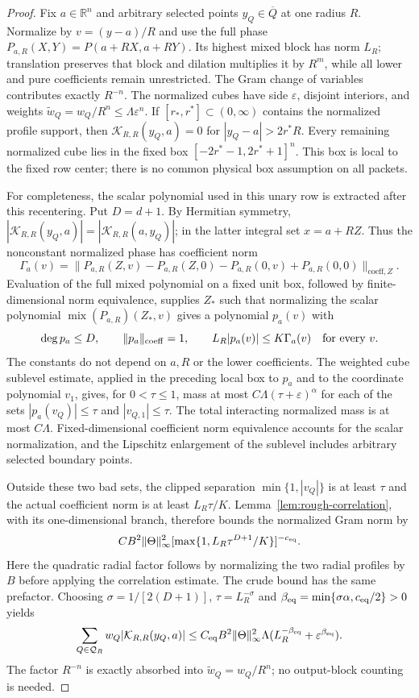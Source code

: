 \documentclass[11pt]{article}
\numberwithin{equation}{section}
\theoremstyle{remark}
\theoremstyle{definition}
\newcommand{\R}{\mathbb R}
\newcommand{\norm}[1]{\lVert #1\rVert}
\begin{document}
\begin{proof}
Fix $a\in\R^n$ and arbitrary selected points $y_Q\in\overline Q$ at
one radius $R$.  Normalize by $v=(y-a)/R$ and use the full phase
$P_{a,R}(X,Y)=P(a+RX,a+RY)$.  Its highest mixed block has norm
$L_R$; translation preserves that block and dilation multiplies it by
$R^m$, while all lower and pure coefficients remain unrestricted.
The Gram change of variables contributes exactly $R^{-n}$.
The normalized cubes have side $\varepsilon$, disjoint interiors,
and weights $\widetilde w_Q=w_Q/R^n\le\Lambda\varepsilon^n$.
If $[r_*,r^*]\subset(0,\infty)$ contains the normalized profile support,
then $\mathcal K_{R,R}(y_Q,a)=0$ for $|y_Q-a|>2r^*R$.
Every remaining normalized cube lies in the fixed box
$[-2r^*-1,2r^*+1]^n$.  This box is local to the fixed row center;
there is no common physical box assumption on all packets.

For completeness, the scalar polynomial used in this unary row is
extracted after this recentering.  Put $D=d+1$.  By Hermitian symmetry,
$|\mathcal K_{R,R}(y_Q,a)|=|\mathcal K_{R,R}(a,y_Q)|$; in the latter
integral set $x=a+RZ$.  Thus the nonconstant normalized phase has
coefficient norm
\[
 \Gamma_a(v)=\bigl\|P_{a,R}(Z,v)-P_{a,R}(Z,0)
               -P_{a,R}(0,v)+P_{a,R}(0,0)\bigr\|_{\mathrm{coeff},Z}.
\]
Evaluation of the full mixed polynomial on a fixed unit box, followed
by finite-dimensional norm equivalence, supplies $Z_*$ such that
normalizing the scalar polynomial
$\operatorname{mix}(P_{a,R})(Z_*,v)$ gives a polynomial $p_a(v)$ with
\[
 \deg p_a\le D,\qquad\norm{p_a}_{\rm coeff}=1,
 \qquad L_R|p_a(v)|\le K\Gamma_a(v)\quad\hbox{for every }v.
\]
The constants do not depend on $a,R$ or the lower coefficients.
The weighted cube sublevel estimate, applied in the preceding local
box to $p_a$ and to the coordinate polynomial $v_1$, gives, for
$0<\tau\le1$, mass at most $C\Lambda(\tau+\varepsilon)^\alpha$
for each of the sets $|p_a(v_Q)|\le\tau$ and $|v_{Q,1}|\le\tau$.
The total interacting normalized mass is at most $C\Lambda$.
Fixed-dimensional coefficient norm equivalence accounts for the scalar
normalization, and the Lipschitz enlargement of the sublevel includes
arbitrary selected boundary points.

Outside these two bad sets, the clipped separation
$\min\{1,|v_Q|\}$ is at least $\tau$ and the actual coefficient norm
is at least $L_R\tau/K$.  Lemma~\ref{lem:rough-correlation}, with its
one-dimensional branch, therefore bounds the normalized Gram norm by
\[
 CB^2\norm\Theta_\infty^2
   [\max\{1,L_R\tau^{D+1}/K\}]^{-c_{\rm eq}}.
\]
Here the quadratic radial factor follows by normalizing the two radial
profiles by $B$ before applying the correlation estimate.  The crude
bound has the same prefactor.  Choosing
$\sigma=1/[2(D+1)]$, $\tau=L_R^{-\sigma}$ and
$\beta_{\rm eq}=\min\{\sigma\alpha,c_{\rm eq}/2\}>0$ yields
\[
 \sum_{Q\in\mathcal Q_R}w_Q|\mathcal K_{R,R}(y_Q,a)|
 \le C_{\rm eq}B^2\norm\Theta_\infty^2\Lambda
       (L_R^{-\beta_{\rm eq}}+\varepsilon^{\beta_{\rm eq}}).
\]
The factor $R^{-n}$ is exactly absorbed into
$\widetilde w_Q=w_Q/R^n$; no output-block counting is needed.


\end{proof}
\end{document}
